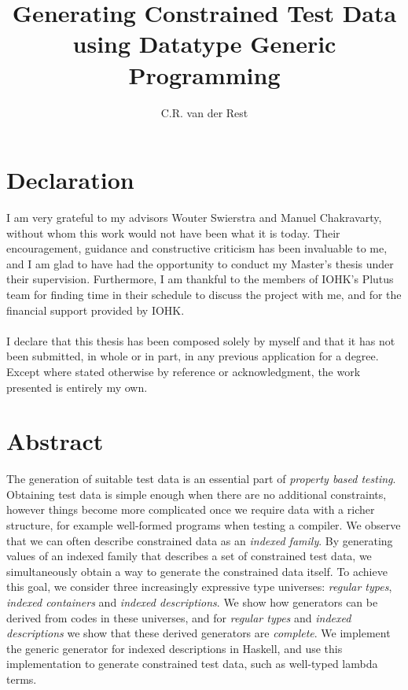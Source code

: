 \documentclass[a4paper,msc,twosized=semi]{uustthesis}
\title{Generating Constrained Test Data using Datatype Generic Programming}
\author{C.R. van der Rest}
\let\oldemph\emph
\renewcommand\emph[1]{{\large\oldemph{#1}}}
\begin{document}
\maketitle


\frontmatter
\tableofcontents

\chapter{Declaration}
I am very grateful to my advisors Wouter Swierstra and Manuel Chakravarty, without whom this work would not have been what it is today. Their encouragement, guidance and constructive criticism has been invaluable to me, and I am glad to have had the opportunity to conduct my Master's thesis under their supervision. Furthermore, I am thankful to the members of IOHK's Plutus team for finding time in their schedule to discuss the project with me, and for the financial support provided by IOHK. \\ \\
I declare that this thesis has been composed solely by myself and that it has not been
submitted, in whole or in part, in any previous application for a degree. Except where
stated otherwise by reference or acknowledgment, the work presented is entirely my
own.

\chapter{Abstract}
The generation of suitable test data is an essential part of \emph{property based testing}. Obtaining test data is simple enough when there are no additional constraints, however things become more complicated once we require data with a richer structure, for example well-formed programs when testing a compiler. We observe that we can often describe constrained data as an \emph{indexed family}. By generating values of an indexed family that describes a set of constrained test data, we simultaneously obtain a way to generate the constrained data itself. To achieve this goal, we consider three increasingly expressive type universes: \emph{regular types}, \emph{indexed containers} and \emph{indexed descriptions}. We show how generators can be derived from codes in these universes, and for \emph{regular types} and \emph{indexed descriptions} we show that these derived generators are \emph{complete}. We implement the generic generator for indexed descriptions in Haskell, and use this implementation to generate constrained test data, such as well-typed lambda terms. 
\end{document}
